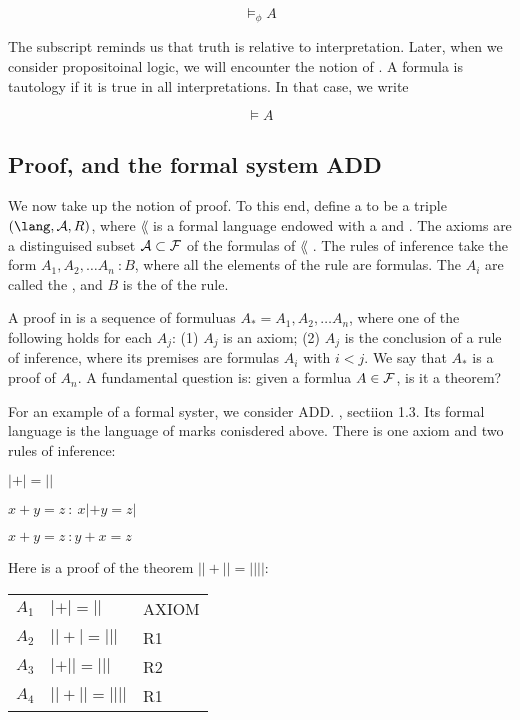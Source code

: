 $$
\models_{\phi} A
$$

The subscript reminds us that truth is relative to interpretation.  Later, when we consider propositoinal logic, we will encounter the notion of .  A formula is tautology if it is true in all interpretations.  In that case, we  write

$$
\models A
$$




\subsection{Proof, and the formal system ADD}

We now take up the notion of proof.  To this end, define
 a    to be a triple
$(\lang, \axioms, R)$, where $\lang$ is a formal language endowed with a  and .  The axioms are a distinguised subset  $\mathcal{A} \subset \mathcal{F}$ of the formulas of $\lang$ . The rules of inference take the form  $A_1, A_2, \ldots A_n\ : B$, where all the elements of the rule are formulas. The $A_i$  are called the , and $B$ is the  of the rule.

  A proof in  is a sequence of formuluas $A_* = A_1, A_2, \ldots A_n$, where one of the following holds for each $A_j$: (1) $A_j$ is an axiom; (2) $A_j$ is the conclusion of a rule of inference, where its premises are formulas $A_i$ with $i < j$.  We say that $A_*$ is a proof of $A_n$.  A fundamental question is: given a formlua $A \in \mathcal{F}$, is it a theorem?

For an example of a formal syster, we consider ADD. \cite{RH}, sectiion 1.3. Its formal language is the language of marks conisdered above.  There is one axiom and two rules of inference:

\begin{indent}
 $| + | = ||$
\end{indent}

\begin{indent}
 $x + y = z \ : \ x| + y = z|$
\end{indent}

\begin{indent}
 $x + y = z \ : y + x = z$
\end{indent}

Here is a proof of the theorem $|| + || = ||||$:

\begin{indent}
\begin{tabular}{lll}
$A_1$ & $| + | = ||$ & AXIOM \\
$A_2$ &$|| + | = |||$ & R1 \\
$A_3$ &$| + || = |||$ & R2 \\
$A_4$ &$|| + || = ||||$ & R1 \\
\end{tabular}
\end{indent}





